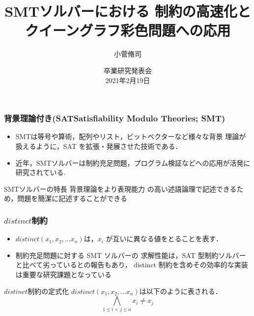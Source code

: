 \documentclass [dvipdfmx,12pt]{beamer}
\title[]{SMTソルバーにおける \distinct 制約の高速化とクイーングラフ彩色問題への応用}
\author{小菅脩司}
\institute{番原研究室}
\date{卒業研究発表会\\2021年2月19日}
\newcommand{\distinct}{$distinct$}
\begin{document}
\begin{frame} {}
    \titlepage
\end{frame}



\begin{frame}
    \frametitle{背景理論付き(SATSatisfiability Modulo Theories; SMT)}
    \begin{itemize}
        \item SMTは等号や算術，配列やリスト，ビットベクターなど様々な背景 理論が扱えるように，SAT を拡張・発展させた技術である．
        \item 近年，SMTソルバーは制約充足問題，プログラム検証などへの応用が活発に研究されている.
    \end{itemize}
    \begin{alertblock}{SMTソルバーの特長}
        背景理論をより表現能力 の高い述語論理で記述できるため，問題を簡潔に記述することができる
    \end{alertblock}
\end{frame}



\begin{frame}
    \frametitle{\distinct 制約}
    \begin{itemize}
        \item $distinct(x_1,x_2,...x_n)$は，$x_i$ が互いに異なる値をとることを表す．
        \item 制約充足問題に対する SMT ソルバーの 求解性能は，SAT 型制約ソルバーと比べて劣っているとの報告もあり， 
            distinct 制約を含めその効率的な実装は重要な研究課題となっている
    \end{itemize}
    \begin{block}{\distinct 制約の定式化}
        $distinct(x_1,x_2,...x_n)$は以下のように表される．\\
        $$\bigwedge_{1 \leq i < j \leq n} x_i \neq x_j$$
    \end{block}
\end{frame}
\end{document}
